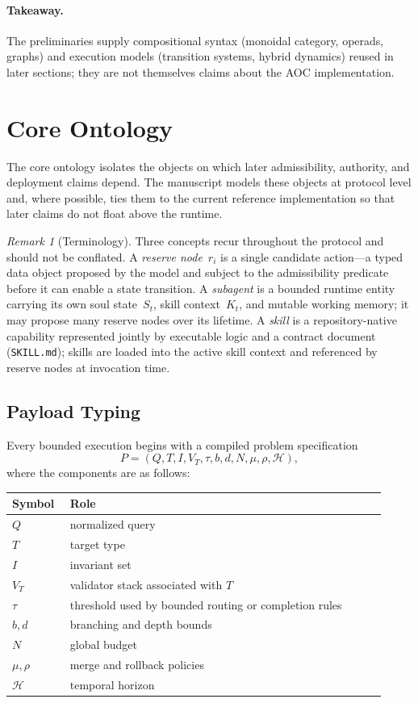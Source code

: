 \documentclass[11pt]{article}
\theoremstyle{remark}
\newtheorem{remark}{Remark}[section]
\newcommand{\AOC}{\textup{\textsc{AOC}}}
\begin{document}
\paragraph{Takeaway.}
The preliminaries supply compositional syntax (monoidal category, operads, graphs) and execution models (transition systems, hybrid dynamics) reused in later sections; they are not themselves claims about the \AOC{} implementation.

\section{Core Ontology}\label{sec:core-ontology}

The core ontology isolates the objects on which later admissibility, authority, and deployment claims depend. The manuscript models these objects at protocol level and, where possible, ties them to the current reference implementation so that later claims do not float above the runtime.

\begin{remark}[Terminology]\label{rem:terminology}
Three concepts recur throughout the protocol and should not be conflated.
A \emph{reserve node}~$r_i$ is a single candidate action---a typed data object proposed by the model and subject to the admissibility predicate before it can enable a state transition.
A \emph{subagent} is a bounded runtime entity carrying its own soul state~$S_t$, skill context~$K_t$, and mutable working memory; it may propose many reserve nodes over its lifetime.
A \emph{skill} is a repository-native capability represented jointly by executable logic and a contract document (\texttt{SKILL.md}); skills are loaded into the active skill context and referenced by reserve nodes at invocation time.
\end{remark}

\subsection{Payload Typing}
Every bounded execution begins with a compiled problem specification
\[
P=(Q,T,I,V_T,\tau,b,d,N,\mu,\rho, \mathcal{H}),
\]
where the components are as follows:
\begin{center}
\small
\begin{tabular}{@{}p{0.14\linewidth}p{0.78\linewidth}@{}}
\toprule
\textbf{Symbol} & \textbf{Role} \\
\midrule
\(Q\) & normalized query \\
\(T\) & target type \\
\(I\) & invariant set \\
\(V_T\) & validator stack associated with \(T\) \\
\(\tau\) & threshold used by bounded routing or completion rules \\
\(b, d\) & branching and depth bounds \\
\(N\) & global budget \\
\(\mu, \rho\) & merge and rollback policies \\
\(\mathcal{H}\) & temporal horizon \\
\bottomrule
\end{tabular}
\end{center}
\end{document}
